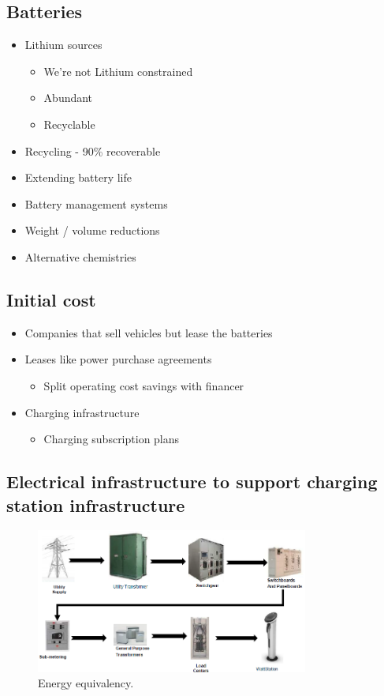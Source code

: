 \subsection{Batteries}
\begin{itemize}
    \item Lithium sources
          \begin{itemize}
              \item We're not Lithium constrained
              \item Abundant
              \item Recyclable
          \end{itemize}
    \item Recycling - 90\% recoverable
    \item Extending battery life
    \item Battery management systems
    \item Weight / volume reductions
    \item Alternative chemistries
\end{itemize}
\subsection{Initial cost}
\begin{itemize}
    \item Companies that sell vehicles but lease the batteries
    \item Leases like power purchase agreements
          \begin{itemize}
              \item Split operating cost savings with financer
          \end{itemize}
    \item Charging infrastructure
          \begin{itemize}
              \item Charging subscription plans
          \end{itemize}
\end{itemize}
\subsection{Electrical infrastructure to support charging station infrastructure}
\begin{figure}[H]
    \centering
    \includegraphics[width = 0.8\textwidth]{img/figure111.png}
    \caption{Energy equivalency.}
\end{figure}

